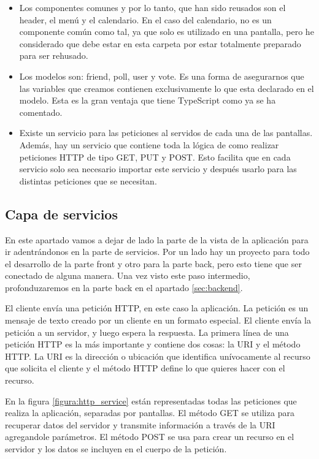 \documentclass[a4paper, 12pt]{book}
\begin{document}
\begin{itemize}
\item Los componentes comunes y por lo tanto, que han sido reusados son el header, el men\'u y el calendario. En el caso del calendario, no es un componente com\'un como tal, ya que solo es utilizado en una pantalla, pero he considerado que debe estar en esta carpeta por estar totalmente preparado para ser rehusado.
\item Los modelos son: friend, poll, user y vote. Es una forma de asegurarnos que las variables que creamos contienen exclusivamente lo que esta declarado en el modelo. Esta es la gran ventaja que tiene TypeScript como ya se ha comentado.

\item Existe un servicio para las peticiones al servidos de cada una de las pantallas. Adem\'as, hay un servicio que contiene toda la l\'ogica de como realizar peticiones HTTP de tipo GET, PUT y POST. Esto facilita que en cada servicio solo sea necesario importar este servicio y despu\'es usarlo para las distintas peticiones que se necesitan.
\end{itemize}


\subsection{Capa de servicios} 
\label{sec:arquitectura}

En este apartado vamos a dejar de lado la parte de la vista de la aplicaci\'on para ir adentr\'andonos en la parte de servicios. Por un lado hay un proyecto para todo el desarrollo de la parte front y otro para la parte back, pero esto tiene que ser conectado de alguna manera. Una vez visto este paso intermedio, profonduzaremos en la parte back en el apartado \ref{sec:backend}.


El cliente env\'ia una petici\'on HTTP, en este caso la aplicaci\'on. La petici\'on es un mensaje de texto creado por un cliente en un formato especial. El cliente env\'ia la petici\'on a un servidor, y luego espera la respuesta. La primera l\'inea de una petici\'on HTTP es la m\'as importante y contiene dos cosas: la URI y el m\'etodo HTTP. La URI es la direcci\'on o ubicaci\'on que identifica un\'ivocamente al recurso que solicita el cliente y el m\'etodo HTTP  define lo que quieres hacer con el recurso.

En la figura \ref{figura:http_service} est\'an representadas todas las peticiones que realiza la aplicaci\'on, separadas por pantallas. El m\'etodo GET se utiliza para recuperar datos del servidor y transmite informaci\'on a trav\'es de la URI agregandole par\'ametros. El m\'etodo POST se usa para crear un recurso en el servidor y los datos se incluyen en el cuerpo de la petici\'on.
\end{document}
